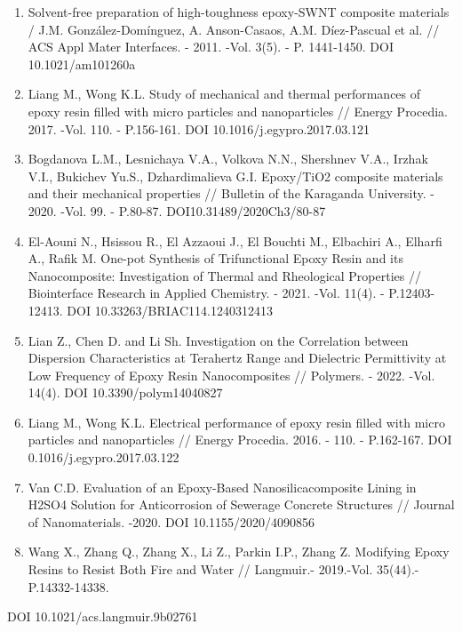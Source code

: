\begin{references}
\begin{enumerate}
\def\labelenumi{\arabic{enumi}.}
\setcounter{enumi}{4}
\item
  Solvent-free preparation of high-toughness epoxy-SWNT composite
  materials / J.M. González-Domínguez, A. Anson-Casaos, A.M.
  Díez-Pascual et al. // ACS Appl Mater Interfaces. - 2011. -Vol. 3(5).
  - P. 1441-1450. DOI 10.1021/am101260a
\item
  Liang M., Wong K.L. Study of mechanical and thermal performances of
  epoxy resin filled with micro particles and nanoparticles // Energy
  Procedia. 2017. -Vol. 110. - P.156-161. DOI
  10.1016/j.egypro.2017.03.121
\item
  Bogdanova L.M., Lesnichaya V.A., Volkova N.N., Shershnev V.A., Irzhak
  V.I., Bukichev Yu.S., Dzhardimalieva G.I. Epoxy/TiO2 composite
  materials and their mechanical properties // Bulletin of the Karaganda
  University. - 2020. -Vol. 99. - P.80-87. DOI10.31489/2020Ch3/80-87
\item
  El-Aouni N., Hsissou R., El Azzaoui J., El Bouchti M., Elbachiri A.,
  Elharfi A., Rafik M. One-pot Synthesis of Trifunctional Epoxy Resin
  and its Nanocomposite: Investigation of Thermal and Rheological
  Properties // Biointerface Research in Applied Chemistry. - 2021.
  -Vol. 11(4). - P.12403-12413. DOI 10.33263/BRIAC114.1240312413
\item
  Lian Z., Chen D. and Li Sh. Investigation on the Correlation between
  Dispersion Characteristics at Terahertz Range and Dielectric
  Permittivity at Low Frequency of Epoxy Resin Nanocomposites //
  Polymers. - 2022. -Vol. 14(4). DOI 10.3390/polym14040827
\item
  Liang M., Wong K.L. Electrical performance of epoxy resin filled with
  micro particles and nanoparticles // Energy Procedia. 2016. - 110. -
  P.162-167. DOI 0.1016/j.egypro.2017.03.122
\item
  Van C.D. Evaluation of an Epoxy-Based Nanosilicacomposite Lining in
  H2SO4 Solution for Anticorrosion of Sewerage Concrete Structures //
  Journal of Nanomaterials. -2020. DOI 10.1155/2020/4090856
\item
  Wang X., Zhang Q., Zhang X., Li Z., Parkin I.P., Zhang Z. Modifying
  Epoxy Resins to Resist Both Fire and Water // Langmuir.- 2019.-Vol.
  35(44).- P.14332-14338.
\end{enumerate}

DOI 10.1021/acs.langmuir.9b02761


\end{references}
